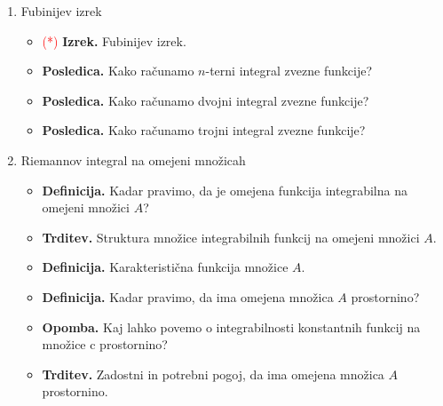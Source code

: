 \begin{enumerate}
    \item Fubinijev izrek
    \begin{itemize}
        \item \textcolor{red}{(*)} \textbf{Izrek.} Fubinijev izrek.
        \item \textbf{Posledica.} Kako računamo \(n\)-terni integral zvezne funkcije?
        \item \textbf{Posledica.} Kako računamo dvojni integral zvezne funkcije?
        \item \textbf{Posledica.} Kako računamo trojni integral zvezne funkcije?
    \end{itemize}

    \item Riemannov integral na omejeni množicah
    \begin{itemize}
        \item \textbf{Definicija.} Kadar pravimo, da je omejena funkcija integrabilna na omejeni množici \(A\)?
        \item \textbf{Trditev.} Struktura množice integrabilnih funkcij na omejeni množici \(A\).
        \item \textbf{Definicija.} Karakteristična funkcija množice \(A\).
        \item \textbf{Definicija.} Kadar pravimo, da ima omejena množica \(A\) prostornino?
        \item \textbf{Opomba.} Kaj lahko povemo o integrabilnosti konstantnih funkcij na množice c prostornino?
        \item \textbf{Trditev.} Zadostni in potrebni pogoj, da ima omejena množica \(A\) prostornino.
    \end{itemize}


\end{enumerate}
